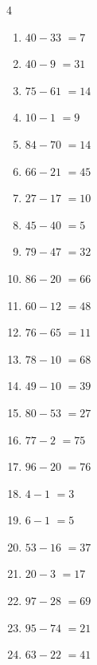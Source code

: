 \begin{multicols}{4}
\begin{enumerate}
  \item $40-33$
        $=7$

  \item $40-9$
        $=31$

  \item $75-61$
        $=14$

  \item $10-1$
        $=9$

  \item $84-70$
        $=14$

  \item $66-21$
        $=45$

  \item $27-17$
        $=10$

  \item $45-40$
        $=5$

  \item $79-47$
        $=32$

  \item $86-20$
        $=66$

  \item $60-12$
        $=48$

  \item $76-65$
        $=11$

  \item $78-10$
        $=68$

  \item $49-10$
        $=39$

  \item $80-53$
        $=27$

  \item $77-2$
        $=75$

  \item $96-20$
        $=76$

  \item $4-1$
        $=3$

  \item $6-1$
        $=5$

  \item $53-16$
        $=37$

  \item $20-3$
        $=17$

  \item $97-28$
        $=69$

  \item $95-74$
        $=21$

  \item $63-22$
        $=41$


\end{enumerate}
\end{multicols}
